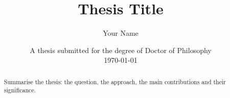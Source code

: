 \documentclass[12pt,a4paper,oneside]{report}
\title{Thesis Title}
\author{Your Name}
\date{A thesis submitted for the degree of Doctor of Philosophy\\[1ex] \today}
\begin{document}
\maketitle

\begin{abstract}
Summarise the thesis: the question, the approach, the main contributions and their significance.
\end{abstract}

\tableofcontents
\listoffigures
\listoftables

\clearpage
{}





\appendix




\end{document}
